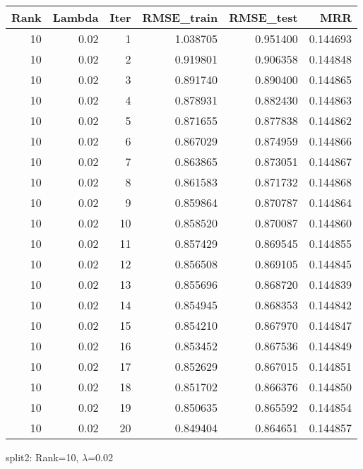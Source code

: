 \begin{tabular}{rrrrrr}
\toprule
 Rank &  Lambda &  Iter &  RMSE\_train &  RMSE\_test &       MRR \\
\midrule
   10 &    0.02 &     1 &    1.038705 &   0.951400 &  0.144693 \\
   10 &    0.02 &     2 &    0.919801 &   0.906358 &  0.144848 \\
   10 &    0.02 &     3 &    0.891740 &   0.890400 &  0.144865 \\
   10 &    0.02 &     4 &    0.878931 &   0.882430 &  0.144863 \\
   10 &    0.02 &     5 &    0.871655 &   0.877838 &  0.144862 \\
   10 &    0.02 &     6 &    0.867029 &   0.874959 &  0.144866 \\
   10 &    0.02 &     7 &    0.863865 &   0.873051 &  0.144867 \\
   10 &    0.02 &     8 &    0.861583 &   0.871732 &  0.144868 \\
   10 &    0.02 &     9 &    0.859864 &   0.870787 &  0.144864 \\
   10 &    0.02 &    10 &    0.858520 &   0.870087 &  0.144860 \\
   10 &    0.02 &    11 &    0.857429 &   0.869545 &  0.144855 \\
   10 &    0.02 &    12 &    0.856508 &   0.869105 &  0.144845 \\
   10 &    0.02 &    13 &    0.855696 &   0.868720 &  0.144839 \\
   10 &    0.02 &    14 &    0.854945 &   0.868353 &  0.144842 \\
   10 &    0.02 &    15 &    0.854210 &   0.867970 &  0.144847 \\
   10 &    0.02 &    16 &    0.853452 &   0.867536 &  0.144849 \\
   10 &    0.02 &    17 &    0.852629 &   0.867015 &  0.144851 \\
   10 &    0.02 &    18 &    0.851702 &   0.866376 &  0.144850 \\
   10 &    0.02 &    19 &    0.850635 &   0.865592 &  0.144854 \\
   10 &    0.02 &    20 &    0.849404 &   0.864651 &  0.144857 \\
\bottomrule
\end{tabular}

\caption{split2: Rank=10, $\lambda$=0.02}
